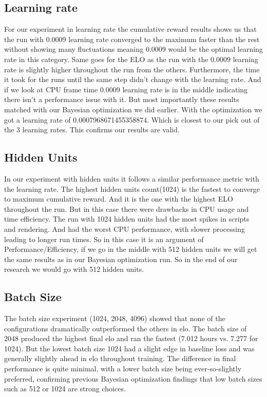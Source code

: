 \documentclass{LSkill}
\begin{document}
\subsection{Learning rate}

For our experiment in learning rate the cumulative reward results shows us that the run with 0.0009 learning rate converged to the maximum faster than the rest without showing many fluctuations meaning 0.0009 would be the optimal learning rate in this category. Same goes for the ELO as the run with the 0.0009 learning rate is slightly higher throughout the run from the others. Furthermore, the time it took for the runs until the same step didn’t change with the learning rate. And if we look at CPU frame time 0.0009 learning rate is in the middle indicating there isn’t a performance issue with it. But most importantly these results matched with our  Bayesian optimization we did earlier. With the optimization we got a learning rate of  0.0007968671455358874. Which is closest to our pick out of the 3 learning rates. This confirms our results are valid.

\subsection{Hidden Units}

In our experiment with hidden units it follows a similar performance metric with the learning rate. The highest hidden units count(1024) is the fastest to converge to maximum cumulative reward. And it is the one with the highest ELO throughout the run. But in this case there were drawbacks in CPU usage and time efficiency. The run with 1024 hidden units had the most spikes in scripts and rendering. And had the worst CPU performance, with slower processing leading to longer run times. So in this case it is an argument of Performance/Efficiency, if we go in the middle with 512 hidden units we will get the same results as in our Bayesian optimization run. So in the end of our research we would go with 512 hidden units.

\subsection{Batch Size}
The batch size experiment (1024, 2048, 4096) showed that none of the configurations dramatically outperformed the others in elo. The batch size of 2048 produced the highest final elo and ran the fastest (7.012 hours vs. 7.277 for 1024). But the lowest batch size 1024 had a slight edge in baseline loss and was generally slightly ahead in elo throughout training. The difference in final performance is quite minimal, with a lower batch size being ever-so-slightly preferred, confirming previous Bayesian optimization findings that low batch sizes such as 512 or 1024 are strong choices.
\end{document}
